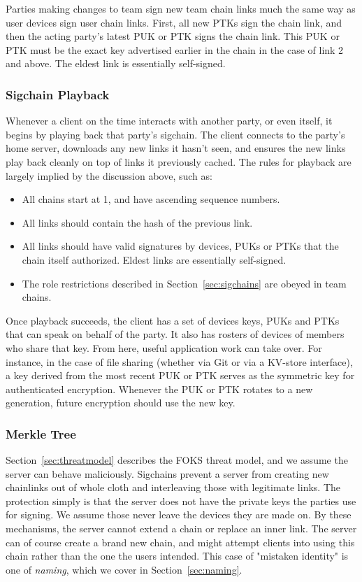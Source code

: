 Parties making changes to team sign new team chain links much the same way as user devices
sign user chain links. First, all new PTKs sign the chain link, and then the acting
party's latest PUK or PTK signs the chain link. This PUK or PTK must be the exact key
advertised earlier in the chain in the case of link 2 and above. The eldest link
is essentially self-signed.

\subsubsection{Sigchain Playback}

Whenever a client on the time interacts with another party, or even itself, it
begins by playing back that party's sigchain. The client connects to the party's home
server, downloads any new links it hasn't seen, and ensures the new links play back
cleanly on top of links it previously cached. The rules for playback are largely
implied by the discussion above, such as:

\begin{itemize}\itemsep0em
    \item All chains start at 1, and have ascending sequence numbers.
    \item All links should contain the hash of the previous link.
    \item All links should have valid signatures by devices, PUKs or PTKs that the chain 
      itself authorized. Eldest links are essentially self-signed.
    \item The role restrictions described in Section~\ref{sec:sigchains} are obeyed in team chains.
\end{itemize}

Once playback succeeds, the client has a set of devices keys, PUKs and PTKs that can
speak on behalf of the party. It also has rosters of devices of members who share that
key. From here, useful application work can take over. For instance, in the case
of file sharing (whether via Git or via a KV-store interface), a key derived from the
most recent PUK or PTK serves as the symmetric key for authenticated encryption. 
Whenever the PUK or PTK rotates to a new generation, future encryption should use the
new key.

\subsubsection{Merkle Tree}
\label{sec:merkle}

Section~\ref{sec:threatmodel} describes the FOKS threat model, and we assume the
server can behave maliciously.  Sigchains prevent a server from creating new
chainlinks out of whole cloth and interleaving those with legitimate links. The
protection simply is that the server does not have the private keys the parties
use for signing. We assume those never leave the devices they are made on. By these 
mechanisms, the server cannot extend a chain or replace an inner link. The server can
of course create a brand new chain, and might attempt clients into using this chain
rather than the one the users intended. This case of "mistaken identity" is one
of \textit{naming}, which we cover in Section~\ref{sec:naming}.

